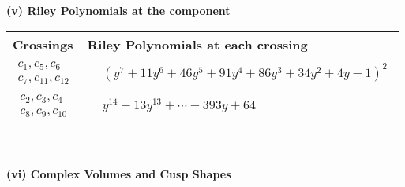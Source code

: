 \documentclass[1p]{elsarticle_modified}
\theoremstyle{definition}
\begin{document}
\newpage\renewcommand{\arraystretch}{1}
\flushleft \textbf{(v) Riley Polynomials at the component}\newline \\
\begin{tabular}{m{50pt}|m{274pt}}
Crossings & \hspace{64pt}Riley Polynomials at each crossing \\
\hline $$\begin{aligned}c_{1},c_{5},c_{6}\\c_{7},c_{11},c_{12}\end{aligned}$$&$\begin{aligned}
&(y^7+11 y^6+46 y^5+91 y^4+86 y^3+34 y^2+4 y-1)^2
\end{aligned}$\\
\hline $$\begin{aligned}c_{2},c_{3},c_{4}\\c_{8},c_{9},c_{10}\end{aligned}$$&$\begin{aligned}
&y^{14}-13 y^{13}+\cdots-393 y+64
\end{aligned}$\\
\hline
\end{tabular}\\~\\
\newpage\flushleft \textbf{(vi) Complex Volumes and Cusp Shapes}
\end{document}
